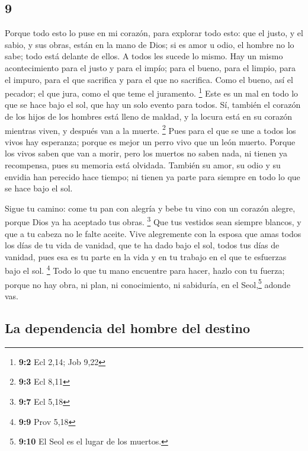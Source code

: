 \begin{paracol}{2}
\hypertarget{section-16}{%
\section{9}\label{section-16}}

 Porque todo esto lo puse en mi corazón, para explorar
todo esto: que el justo, y el sabio, y sus obras, están en la mano de
Dios; si es amor u odio, el hombre no lo sabe; todo está delante de
ellos.  A todos les sucede lo mismo. Hay un mismo
acontecimiento para el justo y para el impío; para el bueno, para el
limpio, para el impuro, para el que sacrifica y para el que no
sacrifica. Como el bueno, así el pecador; el que jura, como el que teme
el juramento. \footnote{\textbf{9:2} Ecl 2,14; Job 9,22} 
Este es un mal en todo lo que se hace bajo el sol, que hay un solo
evento para todos. Sí, también el corazón de los hijos de los hombres
está lleno de maldad, y la locura está en su corazón mientras viven, y
después van a la muerte. \footnote{\textbf{9:3} Ecl 8,11} 
Pues para el que se une a todos los vivos hay esperanza; porque es mejor
un perro vivo que un león muerto.  Porque los vivos saben
que van a morir, pero los muertos no saben nada, ni tienen ya
recompensa, pues su memoria está olvidada.  También su
amor, su odio y su envidia han perecido hace tiempo; ni tienen ya parte
para siempre en todo lo que se hace bajo el sol.

 Sigue tu camino: come tu pan con alegría y bebe tu vino
con un corazón alegre, porque Dios ya ha aceptado tus obras. \footnote{\textbf{9:7}
  Ecl 5,18}  Que tus vestidos sean siempre blancos, y que
a tu cabeza no le falte aceite.  Vive alegremente con la
esposa que amas todos los días de tu vida de vanidad, que te ha dado
bajo el sol, todos tus días de vanidad, pues esa es tu parte en la vida
y en tu trabajo en el que te esfuerzas bajo el sol. \footnote{\textbf{9:9}
  Prov 5,18}  Todo lo que tu mano encuentre para hacer,
hazlo con tu fuerza; porque no hay obra, ni plan, ni conocimiento, ni
sabiduría, en el Seol,\footnote{\textbf{9:10} El Seol es el lugar de los
  muertos.} adonde vas.

\hypertarget{la-dependencia-del-hombre-del-destino}{%
\subsection{La dependencia del hombre del
destino}\label{la-dependencia-del-hombre-del-destino}}


\end{paracol}
